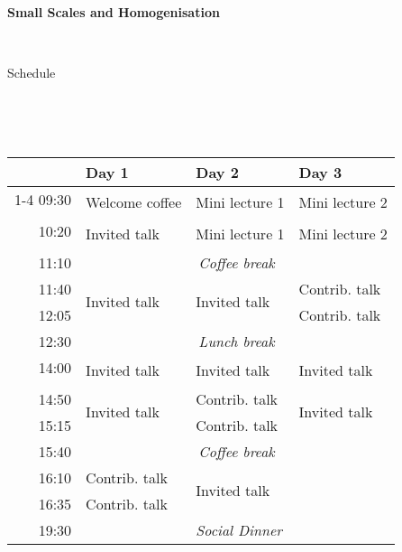 \documentclass{article}
\begin{document}
	\begin{center}
	\textbf{Small Scales and Homogenisation}
	
	\
	
	{\Large{Schedule}}
	
	\
	
	\
	
\begin{tabular}{r|p{3cm}p{3cm}p{3cm}}
\toprule
	\, & Day 1 & Day 2 & Day 3\\
	\cmidrule{1-4}\morecmidrules\cmidrule{1-4}
	09:30 & \multirow{2}{*}{Welcome coffee} & \multirow{2}{*}{Mini lecture 1} & \multirow{2}{*}{Mini lecture 2}\\
	&&&\\
	\midrule
	10:20 & \multirow{2}{*}{Invited talk} & \multirow{2}{*}{Mini lecture 1} & \multirow{2}{*}{Mini lecture 2}\\
	&&&\\
	\midrule
	11:10&\multicolumn{3}{c}{\textit{Coffee break}}\\
	\midrule
	11:40 & \multirow{2}{*}{Invited talk} & \multirow{2}{*}{Invited talk} & Contrib. talk\\
	12:05&&&Contrib. talk\\
	\midrule
	12:30&\multicolumn{3}{c}{\textit{Lunch break}}\\
	\midrule
	14:00 & \multirow{2}{*}{Invited talk} & \multirow{2}{*}{Invited talk} & \multirow{2}{*}{Invited talk}\\
	&&&\\
	\midrule
	14:50 & \multirow{2}{*}{Invited talk} & Contrib. talk& \multirow{2}{*}{Invited talk} \\
	15:15&&Contrib. talk&\\
	\midrule
	15:40&\multicolumn{3}{c}{\textit{Coffee break}}\\
	\midrule
	16:10 & Contrib. talk& \multirow{2}{*}{Invited talk}&\\
	16:35&Contrib. talk&&\\
	\midrule
	19:30 & & \emph{Social Dinner} & \\
	\bottomrule
\end{tabular}
\end{center}
\end{document}
